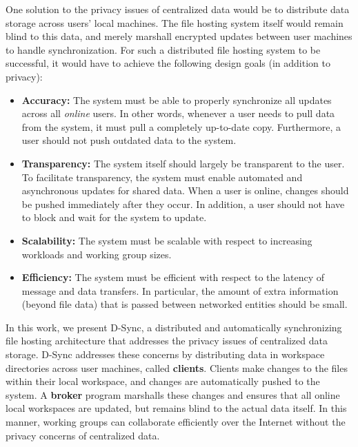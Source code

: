 One solution to the privacy issues of centralized data would be to distribute
data storage across users' local machines.
The file hosting system itself would remain blind to this data, 
and merely marshall encrypted updates between user machines to handle synchronization.
For such a distributed file hosting system to be successful, it would have to achieve
the following design goals (in addition to privacy):
\begin{itemize}
    \item \textbf{Accuracy:} The system must be able to properly synchronize all updates across all \emph{online} users. In other words, whenever a user needs to pull
    data from the system, it must pull a completely up-to-date copy.  Furthermore, a user should not push outdated data to the system.
    \item \textbf{Transparency:} The system itself should largely be transparent to the user. 
    To facilitate transparency, the system must enable automated and asynchronous updates for shared data. When a user is online,
    changes should be pushed immediately after they occur. In addition, a user should not have to block and wait for the system to update.
    \item \textbf{Scalability:} The system must be scalable with respect to increasing workloads and working group sizes.
    \item \textbf{Efficiency:} The system must be efficient with respect to the latency of message and data transfers.
    In particular, the amount of extra information (beyond file data) 
    that is passed between networked entities should be small.
\end{itemize}

In this work, we present D-Sync, a distributed and automatically synchronizing file hosting
architecture that addresses the privacy issues of centralized data storage.
D-Sync addresses these concerns
by distributing data in workspace directories across user machines, called \textbf{clients}.
Clients make changes to the files within their local workspace,
and changes are automatically pushed to the system.
A \textbf{broker} program marshalls these changes and ensures that all online local workspaces are updated,
but remains blind to the actual data itself.
In this manner, working groups can collaborate efficiently over the Internet
without the privacy concerns of centralized data.

